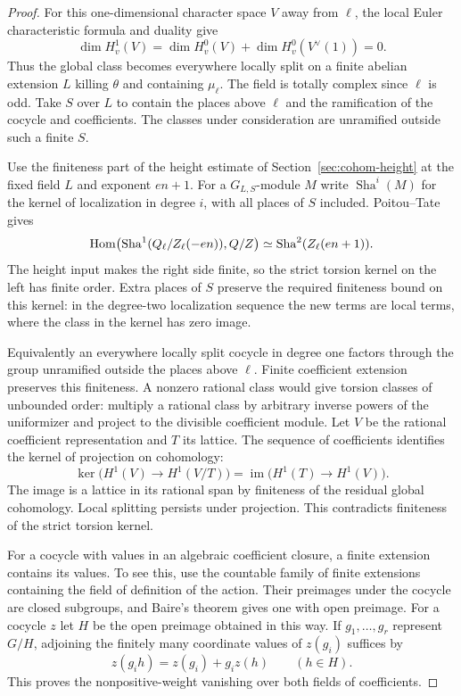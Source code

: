 \begin{proof}
For this one-dimensional character space \(V\) away from \(\ell\), the local Euler characteristic formula and duality give
\[
 \dim H^1_v(V)=\dim H^0_v(V)+\dim H^0_v(V^\vee(1))=0 .
\] Thus the
global class becomes everywhere locally split on a finite
abelian extension \(L\) killing \(\theta\) and containing
\(\mu_\ell\). The field is totally complex since
\(\ell\) is odd. Take \(S\) over \(L\) to contain the
places above \(\ell\) and the ramification of the cocycle
and coefficients. The classes under consideration are
unramified outside such a finite \(S\).

Use the finiteness part of the height estimate of
Section~\ref{sec:cohom-height} at the fixed field \(L\)
and exponent \(en+1\). For a \(G_{L,S}\)-module \(M\) write \(\operatorname{Sha}^i(M)\)
for the kernel of localization in degree \(i\), with all
places of \(S\) included. Poitou--Tate gives
\[
 \operatorname{Hom}\!\left(\operatorname{Sha}^1(Q_\ell/Z_\ell(-en)),
                                     Q/Z\right)
       \simeq \operatorname{Sha}^2(Z_\ell(en+1)).
\]
The height input makes the right side finite, so the strict
torsion kernel on the left has finite order.
Extra places of \(S\) preserve the required finiteness bound
on this kernel: in the degree-two localization sequence
the new terms are local terms, where the class in the
kernel has zero image.

Equivalently an everywhere locally
split cocycle in degree one factors through the group
unramified outside the places above \(\ell\).
Finite coefficient extension preserves this finiteness.
A nonzero rational class would give torsion classes of
unbounded order: multiply a rational class by
arbitrary inverse powers of the uniformizer and project
to the divisible coefficient module. Let \(V\) be the rational coefficient representation and \(T\) its lattice. The sequence of coefficients identifies the kernel of projection on cohomology:
\[
 \ker\bigl(H^1(V)\to H^1(V/T)\bigr)=\operatorname{im}\bigl(H^1(T)\to H^1(V)\bigr).
\]
The image is a lattice in its rational span by finiteness of the residual global cohomology. Local splitting persists
under projection. This contradicts finiteness of the
strict torsion kernel.

For a cocycle with values in an
algebraic coefficient closure, a finite extension contains
its values. To see this, use the countable family of finite
extensions containing the field of definition of the action.
Their preimages under the cocycle are closed subgroups,
and Baire's theorem gives one with open preimage. For a cocycle \(z\) let \(H\) be the open preimage obtained in this way. If \(g_1,\ldots,g_r\) represent \(G/H\), adjoining the finitely many coordinate values of \(z(g_i)\) suffices by
\[
 z(g_i h)=z(g_i)+g_i z(h)\qquad(h\in H).
\] This proves the nonpositive-weight vanishing
over both fields of coefficients.


\end{proof}
